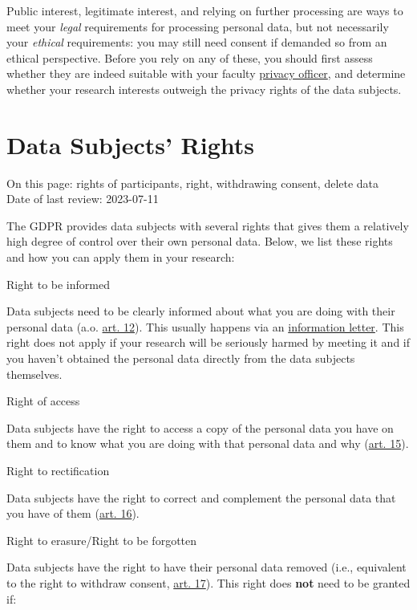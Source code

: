 \documentclass[
]{book}
\begin{document}
Public interest, legitimate interest, and relying on further processing are ways
to meet your \emph{legal} requirements for processing personal data, but not
necessarily your \emph{ethical} requirements: you may still need consent if demanded
so from an ethical perspective. Before you rely on any of these, you should
first assess whether they are indeed suitable with your faculty \protect\hyperlink{support}{privacy officer},
and determine whether your research interests outweigh the privacy rights of
the data subjects.

\hypertarget{data-subject-rights}{%
\section{Data Subjects' Rights}\label{data-subject-rights}}

On this page: rights of participants, right, withdrawing consent, delete data\\
Date of last review: 2023-07-11

The GDPR provides data subjects with several rights that gives them a relatively
high degree of control over their own personal data. Below, we list these rights
and how you can apply them in your research:

Right to be informed

Data subjects need to be clearly informed about what you are doing with their
personal data (a.o. \href{https://gdpr-info.eu/art-12-gdpr/}{art. 12}).
This usually happens via an \protect\hyperlink{privacy-notices}{information letter}. This right
does not apply if your research will be seriously harmed by meeting it and if
you haven't obtained the personal data directly from the data subjects themselves.

Right of access

Data subjects have the right to access a copy of the personal data you have
on them and to know what you are doing with that personal data and why
(\href{https://gdpr-info.eu/art-15-gdpr/}{art. 15}).

Right to rectification

Data subjects have the right to correct and complement the personal data
that you have of them
(\href{https://gdpr-info.eu/art-16-gdpr/}{art. 16}).

Right to erasure/Right to be forgotten

Data subjects have the right to have their personal data removed (i.e.,
equivalent to the right to withdraw consent,
\href{https://gdpr-info.eu/art-17-gdpr/}{art. 17}).
This right does \textbf{not} need to be granted if:
\end{document}
